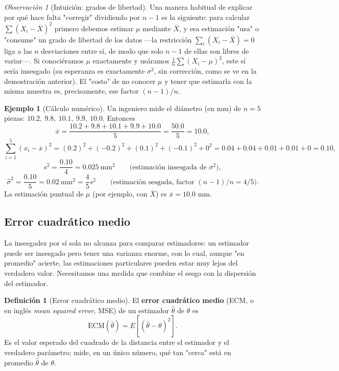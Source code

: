 \documentclass[11pt,a4paper]{article}
\theoremstyle{plain}
\theoremstyle{definition}
\newtheorem{definicion}[teorema]{Definición}
\newtheorem{ejemplo}[teorema]{Ejemplo}
\theoremstyle{remark}
\newtheorem{observacion}[teorema]{Observación}
\begin{document}
\begin{observacion}[Intuición: grados de libertad]
Una manera habitual de explicar por qué hace falta "corregir" dividiendo por $n-1$ es la siguiente: para calcular $\sum(X_i-\overline X)^2$ primero debemos estimar $\mu$ mediante $\overline X$, y esa estimación "usa" o "consume" un grado de libertad de los datos —la restricción $\sum_i (X_i-\overline X)=0$ liga a las $n$ desviaciones entre sí, de modo que solo $n-1$ de ellas son libres de variar—. Si conociéramos $\mu$ exactamente y usáramos $\frac1n\sum(X_i-\mu)^2$, este sí sería insesgado (su esperanza es exactamente $\sigma^2$, sin corrección, como se ve en la demostración anterior). El "costo" de no conocer $\mu$ y tener que estimarla con la misma muestra es, precisamente, ese factor $(n-1)/n$.
\end{observacion}

\begin{ejemplo}[Cálculo numérico]
Un ingeniero mide el diámetro (en mm) de $n=5$ piezas: $10.2,\ 9.8,\ 10.1,\ 9.9,\ 10.0$. Entonces
\[
\overline x = \frac{10.2+9.8+10.1+9.9+10.0}{5} = \frac{50.0}{5} = 10.0,
\]
\[
\sum_{i=1}^5 (x_i-\overline x)^2 = (0.2)^2+(-0.2)^2+(0.1)^2+(-0.1)^2+0^2 = 0.04+0.04+0.01+0.01+0 = 0.10,
\]
\[
s^2 = \frac{0.10}{4} = 0.025 \ \text{mm}^2 \qquad\text{(estimación insesgada de } \sigma^2\text{)},
\]
\[
\widehat\sigma^2 = \frac{0.10}{5} = 0.02 \ \text{mm}^2 = \frac{4}{5}s^2 \qquad\text{(estimación sesgada, factor } (n-1)/n = 4/5\text{)}.
\]
La estimación puntual de $\mu$ (por ejemplo, con $\overline X$) es $\overline x = 10.0$ mm.
\end{ejemplo}

\subsection{Error cuadrático medio}
\label{sec:ecm}

La insesgadez por sí sola no alcanza para comparar estimadores: un estimador puede ser insesgado pero tener una varianza enorme, con lo cual, aunque "en promedio" acierte, las estimaciones particulares pueden estar muy lejos del verdadero valor. Necesitamos una medida que combine el sesgo con la dispersión del estimador.

\begin{definicion}[Error cuadrático medio]
El \textbf{error cuadrático medio} (ECM, o en inglés \emph{mean squared error}, MSE) de un estimador $\widehat\theta$ de $\theta$ es
\[
\mathrm{ECM}(\widehat\theta) = E\left[(\widehat\theta-\theta)^2\right].
\]
Es el valor esperado del cuadrado de la distancia entre el estimador y el verdadero parámetro; mide, en un único número, qué tan "cerca" está en promedio $\widehat\theta$ de $\theta$.
\end{definicion}
\end{document}
